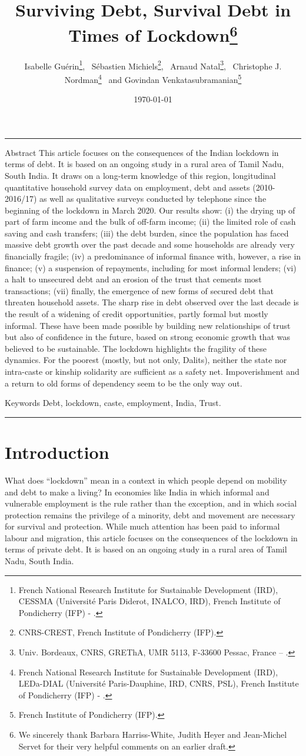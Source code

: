 \documentclass[a4paper, 11pt, onecolumn]{article}
\title{Surviving Debt, Survival Debt in Times of Lockdown\thanks{We sincerely thank Barbara Harriss-White, Judith Heyer and Jean-Michel Servet for their very helpful comments on an earlier draft.}}
\author{Isabelle Guérin\thanks{French National Research Institute for Sustainable Development (IRD), CESSMA (Université Paris Diderot, INALCO, IRD), French Institute of Pondicherry (IFP) - \email{isabelle.guerin@ird.fr}.}, ~Sébastien Michiels\thanks{CNRS-CREST, French Institute of Pondicherry (IFP).}, ~Arnaud Natal\thanks{Univ. Bordeaux, CNRS, GREThA, UMR 5113, F-33600 Pessac, France -- \email{arnaud.natal@u-bordeaux.fr}.}, ~Christophe J. Nordman\thanks{French National Research Institute for Sustainable Development (IRD), LEDa-DIAL (Université Paris-Dauphine, IRD, CNRS, PSL), French Institute of Pondicherry (IFP) - \email{nordman@dial.prd}.} ~and Govindan Venkatasubramanian\thanks{French Institute of Pondicherry (IFP).}}
\date{\today}
\begin{document}
\maketitle

\hrule 
\vspace{0.3cm}

\begin{resab}{Abstract}
This article focuses on the consequences of the Indian lockdown in terms of debt. It is based on an ongoing study in a rural area of Tamil Nadu, South India. It draws on a long-term knowledge of this region, longitudinal quantitative household survey data on employment, debt and assets (2010-2016/17) as well as qualitative surveys conducted by telephone since the beginning of the lockdown in March 2020. 
Our results show: (i) the drying up of part of farm income and the bulk of off-farm income; (ii) the limited role of cash saving and cash transfers; (iii) the debt burden, since the population has faced massive debt growth over the past decade and some households are already very financially fragile; (iv) a predominance of informal finance with, however, a rise in finance; (v) a suspension of repayments, including for most informal lenders; (vi) a halt to unsecured debt and an erosion of the trust that cements most transactions; (vii) finally, the emergence of new forms of secured debt that threaten household assets. The sharp rise in debt observed over the last decade is the result of a widening of credit opportunities, partly formal but mostly informal. These have been made possible by building new relationships of trust but also of confidence in the future, based on strong economic growth that was believed to be sustainable. The lockdown highlights the fragility of these dynamics. For the poorest (mostly, but not only, Dalits), neither the state nor intra-caste or kinship solidarity are sufficient as a safety net. Impoverishment and a return to old forms of dependency seem to be the only way out.  

\end{resab}

\begin{motkey}{Keywords}
Debt, lockdown, caste, employment, India, Trust.
\end{motkey}


\hrule







\section*{Introduction}
\label{section:introduction}
What does ``lockdown'' mean in a context in which people depend on mobility and debt to make a living? In economies like India in which informal and vulnerable employment is the rule rather than the exception, and in which social protection remains the privilege of a minority, debt and movement are necessary for survival and protection. 
While much attention has been paid to informal labour and migration, this article focuses on the consequences of the lockdown in terms of private debt. It is based on an ongoing study in a rural area of Tamil Nadu, South India.
\end{document}
